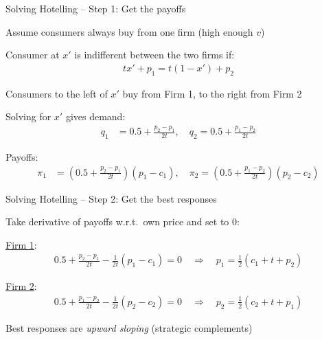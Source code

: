 \documentclass[notes,11pt, aspectratio=169]{beamer}
\newenvironment{wideitemize}{\itemize\addtolength{\itemsep}{10pt}}{\enditemize}
\begin{document}
\begin{frame}{Solving Hotelling -- Step 1: Get the payoffs}
	\begin{wideitemize}
		\item Assume consumers always buy from one firm (high enough $v$)
		\item Consumer at $x'$ is indifferent between the two firms if:
		\begin{align*}
			tx'+p_1 = t(1-x')+p_2
		\end{align*}
		\item Consumers to the left of $x'$ buy from Firm 1, to the right from Firm 2
		\item Solving for $x'$ gives demand:
		\begin{align*}
			q_1 &= 0.5 + \frac{p_2 - p_1}{2t}, \quad
			q_2 = 0.5 + \frac{p_1 - p_2}{2t}
		\end{align*}
		\item Payoffs:
		\begin{align*}
			\pi_1 &= \left(0.5 + \frac{p_2 - p_1}{2t}\right)(p_1-c_1), \quad
			\pi_2 = \left(0.5 + \frac{p_1 - p_2}{2t}\right)(p_2-c_2)
		\end{align*}
	\end{wideitemize}
\end{frame}

\begin{frame}{Solving Hotelling -- Step 2: Get the best responses}
	\begin{wideitemize}
		\item Take derivative of payoffs w.r.t.\ own price and set to 0:
		\item \underline{Firm 1}:
		\begin{align*}
			0.5 + \frac{p_2-p_1}{2t} - \frac{1}{2t}(p_1-c_1) = 0 \quad \Rightarrow \quad p_1 = \frac{1}{2}(c_1+t+p_2)
		\end{align*}
		\item \underline{Firm 2}:
		\begin{align*}
			0.5 + \frac{p_1-p_2}{2t} - \frac{1}{2t}(p_2-c_2) = 0 \quad \Rightarrow \quad p_2 = \frac{1}{2}(c_2+t+p_1)
		\end{align*}
		\item Best responses are \textit{upward sloping} (strategic complements)
	\end{wideitemize}
\end{frame}
\end{document}
